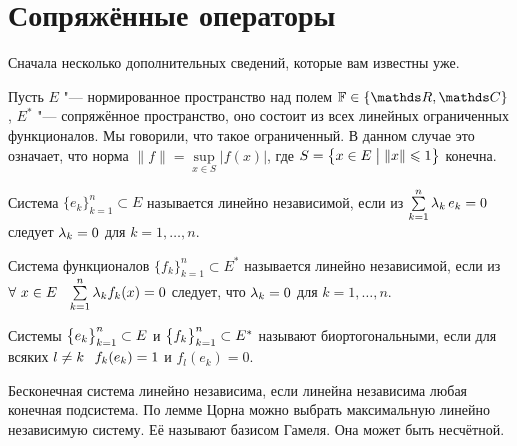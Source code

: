 \section{Сопряжённые операторы}
Сначала несколько дополнительных сведений, которые вам известны уже.

Пусть $E$ "--- нормированное пространство над полем $\F\in\{\R,\C\}$, $E^*$ "--- сопряжённое пространство, оно состоит из всех линейных ограниченных функционалов. Мы говорили, что такое ограниченный. В данном случае это означает, что норма $\|f\| = \sup\limits_{x\in S}\big|f(x)\big|$, где $S = \big\{x\in E\bigm|\|x\|\le 1\big\}$ конечна.

\begin{Def}
  Система $\{e_k\}_{k=1}^n\subset E$ называется линейно независимой, если из $\RY k1n\l_k\,e_k=0$ следует $\l_k=0$ для $k=1,\dots,n$.

Система функционалов $\{f_k\}_{k=1}^n\subset E^*$ называется линейно независимой, если из $\forall\ x\in E\pau \RY k1n \lambda_k f_k(x)=0$ следует, что $\l_k=0$ для $k=1,\dots,n$.
\end{Def}

\begin{Def}
Системы $\ar ek1n\subset E$ и $\ar fk1n\subset E^*$ называют биортогональными, если для всяких $l\ne k\pau f_k(e_k)=1$ и $f_l(e_k)=0$.
\end{Def}

Бесконечная система линейно независима, если линейна независима любая конечная подсистема. По лемме Цорна можно выбрать максимальную линейно независимую систему. Её называют базисом Гамеля. Она может быть несчётной.

